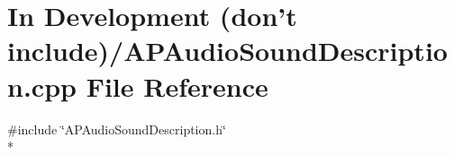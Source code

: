 \hypertarget{_in_01_development_01_07don't_01include_08_2_a_p_audio_sound_description_8cpp}{\section{In Development (don't include)/\+A\+P\+Audio\+Sound\+Description.cpp File Reference}
\label{_in_01_development_01_07don't_01include_08_2_a_p_audio_sound_description_8cpp}
}
{\ttfamily \#include \char`\"{}A\+P\+Audio\+Sound\+Description.\+h\char`\"{}}\\*

